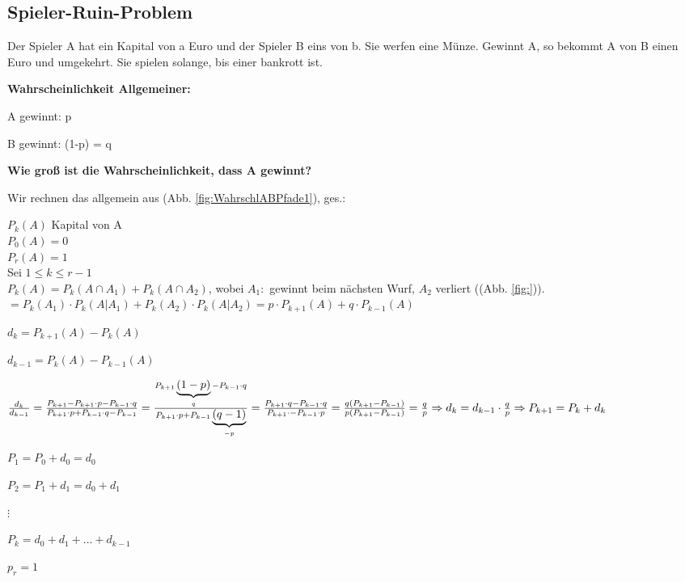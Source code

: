 \subsection{Spieler-Ruin-Problem}
Der Spieler A hat ein Kapital von a Euro und der Spieler B eins von b. Sie werfen eine Münze. Gewinnt A, so bekommt A von B einen Euro und umgekehrt. Sie spielen solange, bis einer bankrott ist. 

\textbf{Wahrscheinlichkeit Allgemeiner:}

A gewinnt: p 

B gewinnt: (1-p) = q

\textbf{Wie groß ist die Wahrscheinlichkeit, dass A gewinnt?}

Wir rechnen das allgemein aus (Abb. \ref{fig:WahrschlABPfade1}), ges.: 

$P_k(A)$ Kapital von A\\
$P_0(A) = 0$\\
$P_r(A) = 1$\\
Sei $1\leq k\leq r-1$\\
$P_k(A) = P_k(A\cap A_1) + P_k(A\cap A_2)$, wobei $A_1:$ gewinnt beim nächsten Wurf, $A_2$ verliert ((Abb. \ref{fig:})).
$
= P_k(A_1) \cdot P_k(A|A_1) + P_k(A_2) \cdot P_k(A|A_2)
= p \cdot P_{k+1}(A) + q \cdot P_{k-1}(A)
$

$d_k = P_{k+1}(A) - P_k(A)$

$d_{k-1} = P_{k}(A) - P_{k-1}(A)$


$
\frac{d_k}{d_{k-1}} = \frac{P_{k+1} - P_{k+1}\cdot p - P_{k-1} \cdot q}{P_{k+1} \cdot p + P_{k-1} \cdot q - P_{k-1}}
= \frac{P_{k+1} \underbrace{(1-p)}_{q} - P_{k-1} \cdot q}{P_{k+1} \cdot p + P_{k-1} \underbrace{(q-1)}_{-p}}
= \frac{P_{k+1} \cdot q - P_{k-1} \cdot q}{P_{k+1} \cdot - P_{k-1} \cdot p}
= \frac{q  \left( P_{k+1} - P_{k-1} \right) }{p  \left( P_{k+1} - P_{k-1} \right) }
= \frac{q}{p}
\Rightarrow d_k = d_{k-1} \cdot \frac{q}{p}
\Rightarrow P_{k+1} = P_k + d_k
$

$P_1 = P_0 + d_0 = d_0$

$P_2 = P_1 + d_1 = d_0 + d_1$

$\vdots$

$P_k = d_0 + d_1 + ... + d_{k-1}$

$p_r = 1$\\

